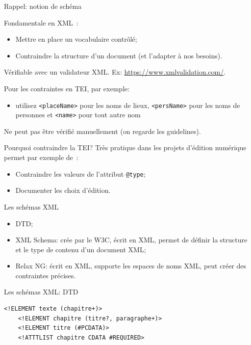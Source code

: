 \begin{frame}{Rappel: notion de schéma}
\begin{block}{Fondamentale en XML~:}
    \begin{itemize}
        \item Mettre en place un vocabulaire contrôlé;
        \item Contraindre la structure d'un document (et l'adapter à nos besoins).
    \end{itemize}
    Vérifiable avec un validateur XML. Ex: \url{https://www.xmlvalidation.com/}.
\end{block}
\begin{block}{}
    Pour les contraintes en TEI, par exemple:
    \begin{itemize}
        \item \og utilisez \texttt{<placeName>} pour les noms de lieux, \texttt{<persName>} pour les noms de personnes et \texttt{<name>} pour tout autre nom\fg
    \end{itemize}
    \textrightarrow{} Ne peut pas être vérifié manuellement (on regarde les guidelines).
\end{block}
\end{frame}

\begin{frame}{Pourquoi contraindre la TEI?}
    Très pratique dans les projets d'édition numérique permet par exemple de~:
    \begin{itemize}
        \item Contraindre les valeurs de l'attribut \texttt{@type};
        \item Documenter les choix d'édition.
    \end{itemize}
\end{frame}

\begin{frame}{Les schémas XML}
    \begin{itemize}
        \item DTD;
        \item XML Schema: crée par le W3C, écrit en XML, permet de définir la structure et le type de contenu d'un document XML;
        \item Relax NG: écrit en XML, supporte les espaces de noms XML, peut créer des contraintes précises.
    \end{itemize}
\end{frame}

\begin{frame}[fragile]{Les schémas XML: DTD}
    \begin{lstlisting}[numbers=none]
    <!ELEMENT texte (chapitre+)>
    <!ELEMENT chapitre (titre?, paragraphe+)>
    <!ELEMENT titre (#PCDATA)>
    <!ATTTLIST chapitre CDATA #REQUIRED>
    \end{lstlisting}
\end{frame}

